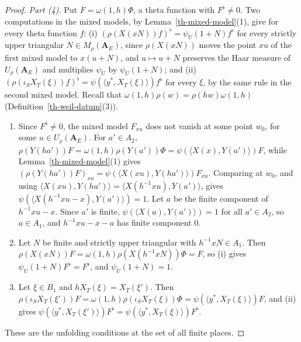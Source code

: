 \begin{proof}
\emph{Part (4).} Put $F=\omega(1,h)\Phi$, a theta function with $F^\flat\neq0$.
Two computations in the mixed models, by Lemma~\ref{th-mixed-model}(1), give for
every theta function $f$:
(i) $(\rho(X(xN))f)^\flat=\psi_U(1+N)f^\flat$ for every strictly upper triangular
$N\in M_\rho(\mathbf A_E)$, since $\rho(X(xN))$ moves the point $xu$ of the first
mixed model to $x(u+N)$, and $u\mapsto u+N$ preserves the Haar measure of
$U_\rho(\mathbf A_E)$ and multiplies $\psi_U$ by $\psi_U(1+N)$; and
(ii) $(\rho(\iota_SX_T(\xi))f)^\flat=\psi(\langle y^*,X_T(\xi)\rangle)f^\flat$
for every $\xi$, by the same rule in the second mixed model. Recall that
$\omega(1,h)\rho(w)=\rho(hw)\omega(1,h)$ (Definition~\ref{th-weil-datum}(3)).
\begin{enumerate}
\item[(a)] Since $F^\flat\neq0$, the mixed model $F_{xu}$ does not vanish at some
  point $w_0$, for some $u\in U_\rho(\mathbf A_E)$. For $a'\in A_2$,
  $\rho(Y(ha'))F=\omega(1,h)\rho(Y(a'))\Phi=\psi(\langle X(x),Y(a')\rangle)F$,
  while Lemma~\ref{th-mixed-model}(1) gives
  $(\rho(Y(ha'))F)_{xu}=\psi(\langle X(xu),Y(ha')\rangle)F_{xu}$. Comparing at
  $w_0$, and using $\langle X(xu),Y(ha')\rangle=\langle X(h^{-1}xu),Y(a')\rangle$,
  gives $\psi(\langle X(h^{-1}xu-x),Y(a')\rangle)=1$. Let $a$ be the finite
  component of $h^{-1}xu-x$. Since $a'$ is finite,
  $\psi(\langle X(a),Y(a')\rangle)=1$ for all $a'\in A_2$, so $a\in A_1$, and
  $h^{-1}xu-x-a$ has finite component $0$.
\item[(b)] Let $N$ be finite and strictly upper triangular with $h^{-1}xN\in A_1$.
  Then $\rho(X(xN))F=\omega(1,h)\rho(X(h^{-1}xN))\Phi=F$, so (i) gives
  $\psi_U(1+N)F^\flat=F^\flat$, and $\psi_U(1+N)=1$.
\item[(c)] Let $\xi\in B_1$ and $hX_T(\xi)=X_T(\xi')$. Then
  $\rho(\iota_SX_T(\xi'))F=\omega(1,h)\rho(\iota_SX_T(\xi))\Phi
  =\psi(\langle y^*,X_T(\xi)\rangle)F$, and (ii) gives
  $\psi(\langle y^*,X_T(\xi')\rangle)F^\flat=\psi(\langle y^*,X_T(\xi)\rangle)F^\flat$.
\end{enumerate}
These are the unfolding conditions at the set of all finite places.
\end{proof}

